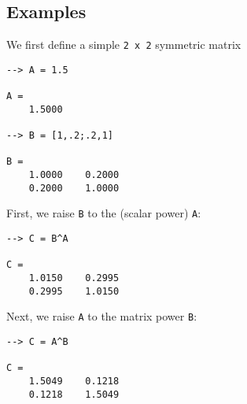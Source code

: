 \subsection{Examples}

We first define a simple \verb|2 x 2| symmetric matrix
\begin{verbatim}
--> A = 1.5

A = 
    1.5000 

--> B = [1,.2;.2,1]

B = 
    1.0000    0.2000 
    0.2000    1.0000 
\end{verbatim}
First, we raise \verb|B| to the (scalar power) \verb|A|:
\begin{verbatim}
--> C = B^A

C = 
    1.0150    0.2995 
    0.2995    1.0150 
\end{verbatim}
Next, we raise \verb|A| to the matrix power \verb|B|:
\begin{verbatim}
--> C = A^B

C = 
    1.5049    0.1218 
    0.1218    1.5049 
\end{verbatim}
